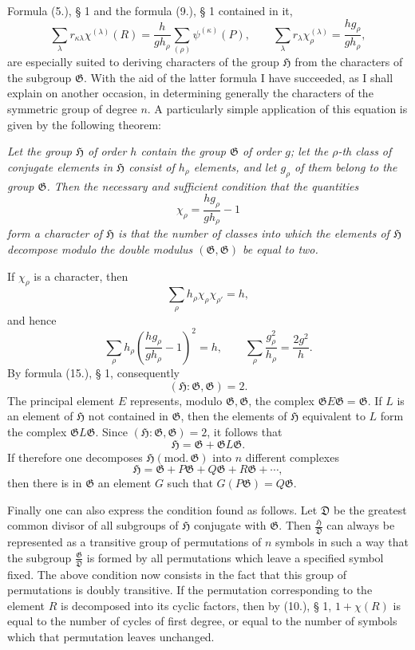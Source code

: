 \documentclass[11pt]{article}
\newcommand{\Hgr}{\mathfrak{H}}
\newcommand{\Ggr}{\mathfrak{G}}
\newcommand{\Dgr}{\mathfrak{D}}
\begin{document}
Formula (5.), § 1 and the formula (9.), § 1 contained in it,
\[
\tag{1.}
  \sum_\lambda r_{\kappa\lambda}\chi^{(\lambda)}(R)
  =
  \frac{h}{g h_\rho}\sum_{(\rho)}\psi^{(\kappa)}(P),
  \qquad
  \sum_\lambda r_\lambda\chi_\rho^{(\lambda)}
  =
  \frac{h g_\rho}{g h_\rho},
\]
are especially suited to deriving characters of the group $\Hgr$ from the characters of the subgroup $\Ggr$. With the aid of the latter formula I have succeeded, as I shall explain on another occasion, in determining generally the characters of the symmetric group of degree $n$. A particularly simple application of this equation is given by the following theorem:

\emph{Let the group $\Hgr$ of order $h$ contain the group $\Ggr$ of order $g$; let the $\rho$-th class of conjugate elements in $\Hgr$ consist of $h_\rho$ elements, and let $g_\rho$ of them belong to the group $\Ggr$. Then the necessary and sufficient condition that the quantities}
\[
\tag{1.}
  \chi_\rho=\frac{h g_\rho}{g h_\rho}-1
\]
\emph{form a character of $\Hgr$ is that the number of classes into which the elements of $\Hgr$ decompose modulo the double modulus $(\Ggr,\Ggr)$ be equal to two.}

If $\chi_\rho$ is a character, then
\[
\tag{2.}
  \sum_\rho h_\rho\chi_\rho\chi_{\rho'}=h,
\]
and hence
\[
  \sum_\rho h_\rho\left(\frac{h g_\rho}{g h_\rho}-1\right)^2=h,
  \qquad
  \sum_\rho\frac{g_\rho^2}{h_\rho}=\frac{2g^2}{h}.
\]
By formula (15.), § 1, consequently
\[
\tag{3.}
  (\Hgr:\Ggr,\Ggr)=2.
\]
The principal element $E$ represents, modulo $\Ggr,\Ggr$, the complex $\Ggr E\Ggr=\Ggr$. If $L$ is an element of $\Hgr$ not contained in $\Ggr$, then the elements of $\Hgr$ equivalent to $L$ form the complex $\Ggr L\Ggr$. Since $(\Hgr:\Ggr,\Ggr)=2$, it follows that
\[
\tag{4.}
  \Hgr=\Ggr+\Ggr L\Ggr.
\]
If therefore one decomposes $\Hgr(\mathrm{mod.}\,\Ggr)$ into $n$ different complexes
\[
  \Hgr=\Ggr+P\Ggr+Q\Ggr+R\Ggr+\cdots,
\]
then there is in $\Ggr$ an element $G$ such that $G(P\Ggr)=Q\Ggr$.

Finally one can also express the condition found as follows. Let $\Dgr$ be the greatest common divisor of all subgroups of $\Hgr$ conjugate with $\Ggr$. Then $\frac{\Hgr}{\Dgr}$ can always be represented as a transitive group of permutations of $n$ symbols in such a way that the subgroup $\frac{\Ggr}{\Dgr}$ is formed by all permutations which leave a specified symbol fixed. The above condition now consists in the fact that this group of permutations is doubly transitive. If the permutation corresponding to the element $R$ is decomposed into its cyclic factors, then by (10.), § 1, $1+\chi(R)$ is equal to the number of cycles of first degree, or equal to the number of symbols which that permutation leaves unchanged.
\end{document}
